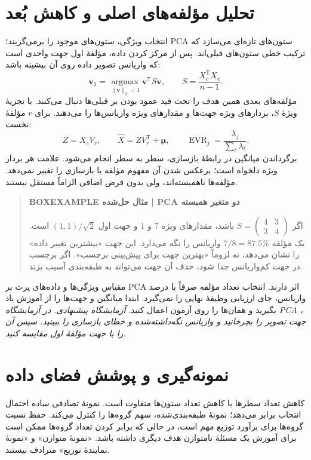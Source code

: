 \section{تحلیل مؤلفه‌های اصلی و کاهش بُعد}
انتخاب ویژگی، ستون‌های موجود را برمی‌گزیند؛ PCA ستون‌های تازه‌ای می‌سازد که ترکیب خطی ستون‌های قبلی‌اند. پس از مرکز کردن داده، مؤلفهٔ اول جهت واحدی است که واریانس تصویر داده روی آن بیشینه باشد:
\[\mathbf v_1=\underset{\|\mathbf v\|_2=1}{\operatorname{argmax}}\mathbf v^\mathsf T S\mathbf v,\qquad S=\frac{X_c^\mathsf T X_c}{n-1}.\]
مؤلفه‌های بعدی همین هدف را تحت قید عمود بودن بر قبلی‌ها دنبال می‌کنند. با تجزیهٔ ویژهٔ $S$، بردارهای ویژه جهت‌ها و مقدارهای ویژه واریانس‌ها را می‌دهند. برای $r$ مؤلفهٔ نخست:
\[Z=X_cV_r,\qquad \widehat X=ZV_r^\mathsf T+\boldsymbol\mu,\qquad \operatorname{EVR}_j=\frac{\lambda_j}{\sum_\ell\lambda_\ell}.\]
برگرداندن میانگین در رابطهٔ بازسازی، سطر به سطر انجام می‌شود. علامت هر بردار ویژه دلخواه است؛ برعکس شدن آن مفهوم مؤلفه یا بازسازی را تغییر نمی‌دهد. مؤلفه‌ها ناهمبسته‌اند، ولی بدون فرض اضافی الزاماً مستقل نیستند.

\begin{quote}\textbf{BOXEXAMPLE مثال حل‌شده | PCA دو متغیر همبسته}\par 
اگر $S=\left(\begin{smallmatrix}4&3\\3&4\end{smallmatrix}\right)$ باشد، مقدارهای ویژه $7$ و $1$ و جهت اول $(1,1)/\sqrt2$ است. یک مؤلفه $7/8=87.5\%$ واریانس را نگه می‌دارد. این جهت «بیشترین تغییر داده» را نشان می‌دهد، نه لزوماً «بهترین جهت برای پیش‌بینی برچسب». اگر برچسب در جهت کم‌واریانس جدا شود، حذف آن جهت می‌تواند به طبقه‌بندی آسیب بزند.
\end{quote}

مقیاس ویژگی‌ها و داده‌های پرت بر PCA اثر دارند. انتخاب تعداد مؤلفه صرفاً با درصد واریانس، جای ارزیابی وظیفهٔ نهایی را نمی‌گیرد. ابتدا میانگین و جهت‌ها را از آموزش یاد بگیرید و همان‌ها را روی آزمون اعمال کنید.
\textit{آزمایشگاه پیشنهادی. در آزمایشگاه PCA ، جهت تصویر را بچرخانید و واریانس نگه‌داشته‌شده و خطای بازسازی را ببینید. سپس آن را با جهت مؤلفهٔ اول مقایسه کنید.}\par 

\section{نمونه‌گیری و پوشش فضای داده}
کاهش تعداد سطرها با کاهش تعداد ستون‌ها متفاوت است. نمونهٔ تصادفی ساده احتمال انتخاب برابر می‌دهد؛ نمونهٔ طبقه‌بندی‌شده، سهم گروه‌ها را کنترل می‌کند. حفظ نسبت گروه‌ها برای برآورد توزیع مهم است، در حالی که برابر کردن تعداد گروه‌ها ممکن است برای آموزش یک مسئلهٔ نامتوازن هدف دیگری داشته باشد. «نمونهٔ متوازن» و «نمونهٔ نمایندهٔ توزیع» مترادف نیستند.

